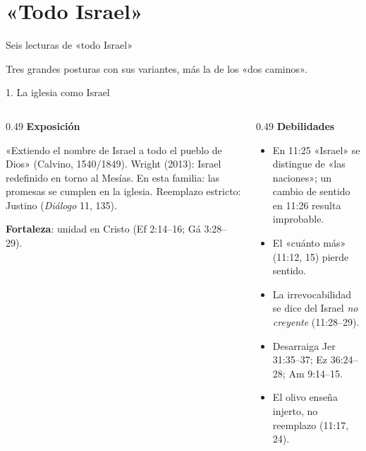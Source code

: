 \section{«Todo Israel»}
\begin{frame}{Seis lecturas de «todo Israel»}
\centering
{}\par
\elabpropia\vspace{4pt}
{\small Tres grandes posturas con sus variantes, más la de los «dos caminos».}
\end{frame}

\begin{frame}{1. La iglesia como Israel}
\begin{columns}[T,onlytextwidth]
\begin{column}{0.49\textwidth}\small\RaggedRight
\textbf{\textcolor{cafe}{Exposición}}\par
«Extiendo el nombre de Israel a todo el pueblo de Dios» (Calvino, 1540/1849). Wright (2013): Israel redefinido en torno al Mesías. En esta familia: las promesas se cumplen en la iglesia. Reemplazo estricto: Justino (\emph{Diálogo} 11, 135).\par\smallskip
\textbf{\textcolor{cafe}{Fortaleza}}: unidad en Cristo (Ef 2:14--16; Gá 3:28--29).
\end{column}
\begin{column}{0.49\textwidth}\scriptsize\RaggedRight
\textbf{\textcolor{ladrillo}{Debilidades}}
\begin{itemize}
\item En 11:25 «Israel» se distingue de «las naciones»; un cambio de sentido en 11:26 resulta improbable.
\item El «cuánto más» (11:12, 15) pierde sentido.
\item La irrevocabilidad se dice del Israel \emph{no creyente} (11:28--29).
\item Desarraiga Jer 31:35--37; Ez 36:24--28; Am 9:14--15.
\item El olivo enseña injerto, no reemplazo (11:17, 24).
\end{itemize}
\end{column}
\end{columns}
\end{frame}

